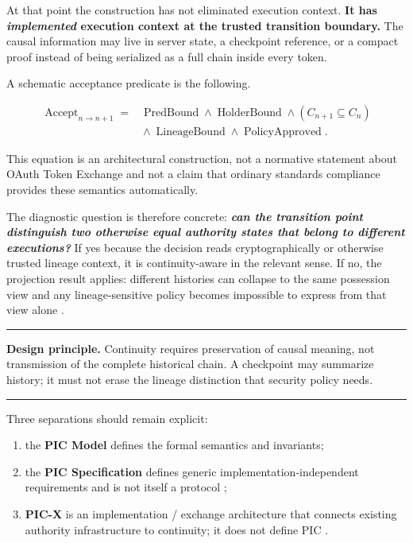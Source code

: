 \documentclass[10pt,oneside,openany]{book}
\newcommand{\principle}[1]{%
  \vspace{4pt}
  \noindent\begin{minipage}{\linewidth}
  \hrule\vspace{5pt}
  \small\sffamily\raggedright\textbf{Design principle.} #1
  \vspace{5pt}\hrule
  \end{minipage}\vspace{4pt}
}
\begin{document}
At that point the construction has not eliminated execution context. \textbf{It has \emph{implemented} execution context at the trusted transition boundary.} The causal information may live in server state, a checkpoint reference, or a compact proof instead of being serialized as a full chain inside every token.

A schematic acceptance predicate is the following.
\begin{formulabox}
\[
\begin{aligned}
\operatorname{Accept}_{n\rightarrow n+1} ={}&
\operatorname{PredBound}\land\operatorname{HolderBound}\land
(C_{n+1}\subseteq C_n)\\
&{}\land\operatorname{LineageBound}\land\operatorname{PolicyApproved}.
\end{aligned}
\]
\end{formulabox}
This equation is an architectural construction, not a normative statement about OAuth Token Exchange and not a claim that ordinary standards compliance provides these semantics automatically.

The diagnostic question is therefore concrete: \textbf{\emph{can the transition point distinguish two otherwise equal authority states that belong to different executions?}} If yes because the decision reads cryptographically or otherwise trusted lineage context, it is continuity-aware in the relevant sense. If no, the projection result applies: different histories can collapse to the same possession view and any lineage-sensitive policy becomes impossible to express from that view alone \cite{gallo2026pic}.

\principle{Continuity requires preservation of causal meaning, not transmission of the complete historical chain. A checkpoint may summarize history; it must not erase the lineage distinction that security policy needs.}

Three separations should remain explicit:

\begin{enumerate}
\item the \textbf{PIC Model} defines the formal semantics and invariants;
\item the \textbf{PIC Specification} defines generic implementation-independent requirements and is not itself a protocol \cite{picspec};
\item \textbf{PIC-X} is an implementation / exchange architecture that connects existing authority infrastructure to continuity; it does not define PIC \cite{picimpl}.
\end{enumerate}
\end{document}
